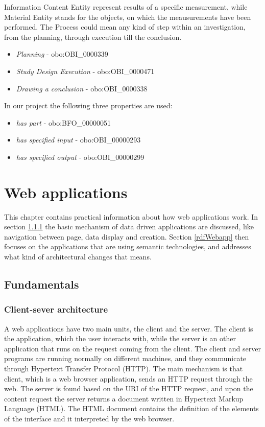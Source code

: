 Information Content Entity represent results of a specific measurement, while Material Entity stands for the objects, on which the meausurements have been performed. 
The Process could mean any kind of step within an investigation, from the planning, through execution till the conclusion.

\begin{itemize}
	\item  \textit{Planning} - obo:OBI\_0000339
	\item  \textit{Study Design Execution} - obo:OBI\_0000471
	\item  \textit{Drawing a conclusion} - obo:OBI\_0000338
\end{itemize}


In our project the following three properties are used:

\begin{itemize}
	\item  \textit{has part} - obo:BFO\_00000051
	\item  \textit{has specified input} - obo:OBI\_00000293
	\item  \textit{has specified output} - obo:OBI\_00000299
\end{itemize}


\section{Web applications}

This chapter contains practical information about how web applications work. In section \ref{clientServer} the basic mechanism of data driven applications are discussed, like navigation between page, data display and creation. Section \ref{rdfWebapp} then focuses on the applications that are using semantic technologies, and addresses what kind of architectural changes that means.


\subsection{Fundamentals} \label{fundamentals}

\subsubsection{Client-sever architecture} \label{clientServer}

A web applications have two main units, the client and the server. The client is the application, which the user interacts with, while the server is an other application that runs on the request coming from the client. The client and server programs are running normally on different machines, and they communicate through Hypertext Transfer Protocol (HTTP). The main mechanism is that client, which is a web browser application, sends an HTTP request through the web. The server is found based on the URI of the HTTP request, and upon the content request the server returns a document written in Hypertext Markup Language (HTML). The HTML document contains the definition of the elements of the interface and it interpreted by the web browser.

